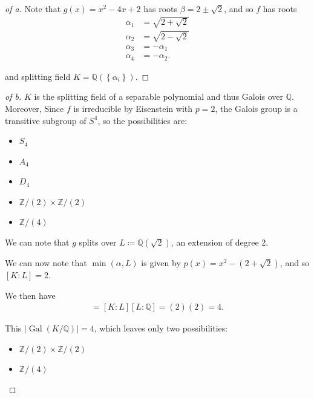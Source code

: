 \begin{solution}

\envlist

\begin{proof}[of a]

Note that \(g(x) = x^2 - 4x + 2\) has roots \(\beta = 2 \pm \sqrt{2}\),
and so \(f\) has roots
\begin{align*}
\alpha_1 &= \sqrt{2 + \sqrt 2} \\
\alpha_2 &= \sqrt{2 - \sqrt 2} \\
\alpha_3 &= -\alpha_1 \\
\alpha_4 &= -\alpha_2
.\end{align*}

and splitting field \(K = {\mathbb{Q}}(\left\{{\alpha_i}\right\})\).

\end{proof}

\begin{proof}[of b]

\(K\) is the splitting field of a separable polynomial and thus Galois
over \({\mathbb{Q}}\). Moreover, Since \(f\) is irreducible by
Eisenstein with \(p=2\), the Galois group is a transitive subgroup of
\(S^4\), so the possibilities are:

\begin{itemize}
\tightlist
\item
  \(S_4\)
\item
  \(A_4\)
\item
  \(D_4\)
\item
  \({\mathbb{Z}}/(2) \times{\mathbb{Z}}/(2)\)
\item
  \({\mathbb{Z}}/(4)\)
\end{itemize}

We can note that \(g\) splits over \(L \coloneqq{\mathbb{Q}}(\sqrt 2)\),
an extension of degree 2.

We can now note that \(\min(\alpha, L)\) is given by
\(p(x) = x^2 - (2 + \sqrt 2)\), and so \([K: L] = 2\).

We then have
\begin{align*}
[K: {\mathbb{Q}}] = [K: L] [L : {\mathbb{Q}}] = (2)(2) = 4
.\end{align*}

This
\({\left\lvert {\operatorname{Gal}(K/{\mathbb{Q}})} \right\rvert} = 4\),
which leaves only two possibilities:

\begin{itemize}
\tightlist
\item
  \({\mathbb{Z}}/(2) \times{\mathbb{Z}}/(2)\)
\item
  \({\mathbb{Z}}/(4)\)
\end{itemize}


\end{proof}
\end{solution}

